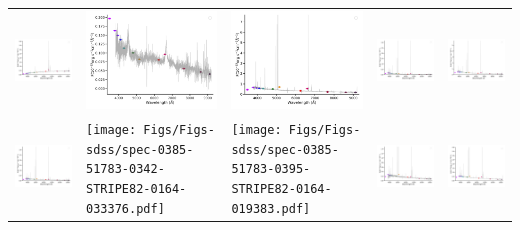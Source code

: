 \begin{center}
\begin{longtable}{l l l l l }
    \includegraphics[width=0.19\linewidth, clip]{Figs/Figs-sdss/spec-0289-51990-0542-SPLUS-n01s28-027608.pdf} & \includegraphics[width=0.19\linewidth, clip]{Figs/Figs-sdss/spec-0327-52294-0620-SPLUS-n02s19-022704.pdf} & \includegraphics[width=0.19\linewidth, clip]{Figs/Figs-sdss/spec-0329-52056-0529-SPLUS-n02s20-017833.pdf} & \includegraphics[width=0.19\linewidth, clip]{Figs/Figs-sdss/spec-0330-52370-0072-SPLUS-n03s22-026437.pdf} & \includegraphics[width=0.19\linewidth, clip]{Figs/Figs-sdss/spec-0330-52370-0131-SPLUS-n03s21-001338.pdf} \\
    \includegraphics[width=0.19\linewidth, clip]{Figs/Figs-sdss/spec-0330-52370-0144-SPLUS-n03s21-009182.pdf} & \texttt{[image: Figs/Figs-sdss/spec-0385-51783-0342-STRIPE82-0164-033376.pdf]} & \texttt{[image: Figs/Figs-sdss/spec-0385-51783-0395-STRIPE82-0164-019383.pdf]} & \includegraphics[width=0.19\linewidth, clip]{Figs/Figs-sdss/spec-0389-51795-0544-STRIPE82-0008-021736.pdf} & \includegraphics[width=0.19\linewidth, clip]{Figs/Figs-sdss/spec-0390-51900-0596-STRIPE82-0010-026778.pdf} \\

\end{longtable}
\end{center}
